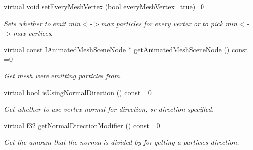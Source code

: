 \begin{DoxyCompactItemize}
virtual void \hyperlink{classirr_1_1scene_1_1IParticleAnimatedMeshSceneNodeEmitter_adfb1ff0bef8f6a86be81f928f5d27784}{set\+Every\+Mesh\+Vertex} (bool every\+Mesh\+Vertex=true)=0
\begin{DoxyCompactList}\small\item\em Sets whether to emit min$<$-\/$>$max particles for every vertex or to pick min$<$-\/$>$max vertices. \end{DoxyCompactList}\item 
\mbox{\label{classirr_1_1scene_1_1IParticleAnimatedMeshSceneNodeEmitter_a7db412dd66d33b05074b59005798fc00}} 
virtual const \hyperlink{classirr_1_1scene_1_1IAnimatedMeshSceneNode}{I\+Animated\+Mesh\+Scene\+Node} $\ast$ \hyperlink{classirr_1_1scene_1_1IParticleAnimatedMeshSceneNodeEmitter_a7db412dd66d33b05074b59005798fc00}{get\+Animated\+Mesh\+Scene\+Node} () const =0
\begin{DoxyCompactList}\small\item\em Get mesh we\textquotesingle{}re emitting particles from. \end{DoxyCompactList}\item 
\mbox{\label{classirr_1_1scene_1_1IParticleAnimatedMeshSceneNodeEmitter_aa72ac0294ad9b01710e5e935c77a8191}} 
virtual bool \hyperlink{classirr_1_1scene_1_1IParticleAnimatedMeshSceneNodeEmitter_aa72ac0294ad9b01710e5e935c77a8191}{is\+Using\+Normal\+Direction} () const =0
\begin{DoxyCompactList}\small\item\em Get whether to use vertex normal for direction, or direction specified. \end{DoxyCompactList}\item 
\mbox{\label{classirr_1_1scene_1_1IParticleAnimatedMeshSceneNodeEmitter_a473f626357779e7aaf4080aa41414b4a}} 
virtual \hyperlink{namespaceirr_a0277be98d67dc26ff93b1a6a1d086b07}{f32} \hyperlink{classirr_1_1scene_1_1IParticleAnimatedMeshSceneNodeEmitter_a473f626357779e7aaf4080aa41414b4a}{get\+Normal\+Direction\+Modifier} () const =0
\begin{DoxyCompactList}\small\item\em Get the amount that the normal is divided by for getting a particles direction. \end{DoxyCompactList}\item 

\end{DoxyCompactItemize}
